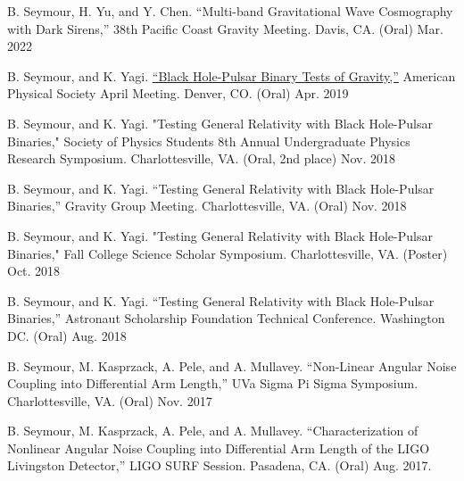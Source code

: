 \begin{cvpresentationsmod}

    \cvpresentation
    {B. Seymour, H. Yu, and Y. Chen. “Multi-band Gravitational Wave Cosmography with Dark Sirens,” 38th Pacific Coast Gravity Meeting. Davis, CA. (Oral)}
    {Mar. 2022}


    \cvpresentation
    {B. Seymour, and K. Yagi. \href{https://meetings.aps.org/Meeting/APR19/Session/D16.7}{“Black Hole-Pulsar Binary Tests of Gravity,”} American Physical Society April Meeting. Denver, CO. (Oral)}
    {Apr. 2019}
    
  \cvpresentation
    {B. Seymour, and K. Yagi. "Testing General Relativity with Black Hole-Pulsar Binaries," Society of Physics Students 8th Annual Undergraduate Physics Research Symposium. Charlottesville, VA. (Oral, 2nd place)} %
    {Nov. 2018 } %
    
  \cvpresentation
    {B. Seymour, and K. Yagi. “Testing General Relativity with Black Hole-Pulsar Binaries,” Gravity Group Meeting. Charlottesville, VA. (Oral)} %
    {Nov. 2018} %
    

  \cvpresentation
    {B. Seymour, and K. Yagi. "Testing General Relativity with Black Hole-Pulsar Binaries," Fall College Science Scholar Symposium. Charlottesville, VA. (Poster)} %
    {Oct. 2018} %



  \cvpresentation
    {B. Seymour, and K. Yagi. “Testing General Relativity with Black Hole-Pulsar Binaries,” Astronaut Scholarship Foundation Technical Conference. Washington DC. (Oral)} %
    {Aug. 2018} %



  \cvpresentation
    {B. Seymour, M. Kasprzack, A. Pele, and A. Mullavey. “Non-Linear Angular Noise Coupling into Differential Arm Length,” UVa Sigma Pi Sigma Symposium. Charlottesville, VA. (Oral)} %
    {Nov. 2017} %



  \cvpresentation
    {B. Seymour, M. Kasprzack, A. Pele, and A. Mullavey. “Characterization of Nonlinear Angular Noise Coupling into Differential Arm Length of the LIGO Livingston Detector,” LIGO SURF Session. Pasadena, CA. (Oral)} %
    {Aug. 2017.} %



\end{cvpresentationsmod}
